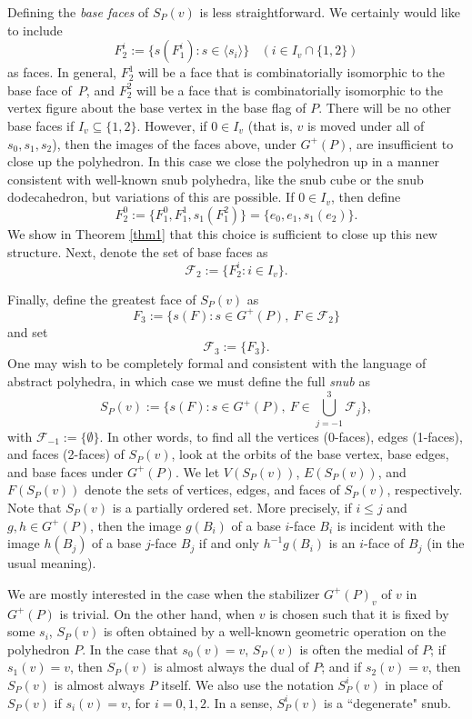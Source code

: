\documentclass[12pt]{article}
\theoremstyle{definition}\newtheorem{definition}{Definition}[section]
\begin{document}
Defining the \textit{base faces} of $S_P(v)$ is less straightforward. We certainly would like to include 
\begin{equation}
\label{F2i}
F_2^{i} := \{s(F_1^{i}):s\in \langle s_i \rangle\}\ \ \ \ (i \in I_v \cap \{1,2\})
\end{equation}
as faces. In general, $F_2^1$ will be a face that is combinatorially isomorphic to the base face of~$P$, and $F_2^2$ will be a face that is combinatorially isomorphic to the vertex figure  about the base vertex in the base flag of $P$. There will be no other base faces if $I_v\subseteq\{1,2\}$. However, if $0\in I_v$ (that is, $v$ is moved under all of $s_0,s_1,s_2$), then the images of the faces above, under $G^+(P)$, are insufficient to close up the polyhedron. In this case we close the polyhedron up in a manner consistent with well-known snub polyhedra, like the snub cube or the snub dodecahedron, but variations of this are possible. If $0\in I_v$, then define 
\begin{equation}
\label{F20}
F_2^{0}:=\{F_1^{0}, F_1^{1}, s_1(F_1^{2})\} = \{e_0,e_1,s_1(e_2)\}.
\end{equation}
We show in Theorem \ref{thm1} that this choice is sufficient to close up this new structure. Next, denote the set of base faces as 
\[\mathcal{F}_2 := \{F_2^{i}:i \in I_v\}.\]
\smallskip

Finally, define the greatest face of ${S}_P(v)$ as $$F_3 := \{ s(F):s\in G^+(P), \ F\in\mathcal{F}_2 \}$$ and set $$\mathcal{F}_3 := \{F_3\}.$$ One may wish to be completely formal and consistent with the language of abstract polyhedra, in which case we must define the full \textit{snub} as 
\begin{equation}
\label{SPv}
{S}_P(v) := \{s(F): s\in G^+(P), \ F\in \bigcup_{j=-1}^3 \mathcal{F}_j \},
\end{equation}
with $\mathcal{F}_{-1}:=\{\emptyset\}$. In other words, to find all the vertices (0-faces), edges (1-faces), and faces (2-faces) of ${S}_P(v)$, look at the orbits of the base vertex, base edges, and base faces under $G^+(P)$. We let $V({S}_P(v))$, $E({S}_P(v))$, and $F({S}_P(v))$ denote the sets of vertices, edges, and faces of ${S}_P(v)$, respectively. Note that ${S}_P(v)$ is a partially ordered set. More precisely, if $i\leq j$ and $g,h \in G^+(P)$, then the image $g(B_i)$ of a base $i$-face $B_i$ is incident with the image $h(B_j)$ of a base $j$-face $B_j$ if and only $h^{-1}g(B_i)$ is an $i$-face of $B_j$ (in the usual meaning). \smallskip

We are mostly interested in the case when the stabilizer $G^+(P)_v$ of $v$ in $G^+(P)$ is trivial. On the other hand, when $v$ is chosen such that it is fixed by some $s_i$, ${S}_P(v)$ is often obtained by a well-known geometric operation on the polyhedron $P$. In the case that $s_0(v)=v$, ${S}_P(v)$ is often the medial of $P$; if $s_1(v)=v$, then ${S}_P(v)$ is almost always the dual of $P$; and if $s_2(v)=v$, then ${S}_P(v)$ is almost always $P$ itself. We also use the notation ${S}_P^i(v)$ in place of ${S}_P(v)$ if $s_i(v)=v$, for $i=0,1,2$. In a sense, ${S}_P^i(v)$ is a ``degenerate" snub.
\smallskip
\end{document}
